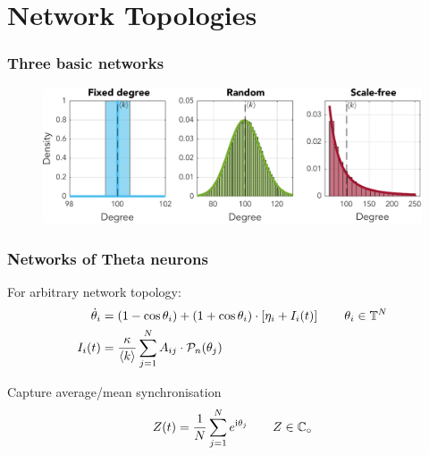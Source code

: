 


\section{\theory Network Topologies}
\begin{frame}
\frametitle{Three basic networks}
\begin{figure}[H]
\centering
\includegraphics[width = \textwidth]{../Figures/Distributions/1D.pdf}
\label{fig:1Dpdfs}
\end{figure}
\end{frame}

\begin{frame}
\frametitle{Networks of Theta neurons}
\tabitem For arbitrary network topology:
\begin{align*}
\dot{\theta}_{i} &=\left(1-\cos \theta_{i}\right)+\left(1+\cos \theta_{i}\right) \cdot \left[\eta_{i} + I_{i}(t)\right] \qquad \theta_i \in {\mathbb{T}}^N \\
I_{i}(t) &=\frac{\kappa}{{\langle k\rangle}} \sum_{j=1}^{N} A_{i j} \cdot \mathcal{P}_{n}(\theta_{j}) 
\end{align*}

\tabitem Capture average/mean synchronisation
\begin{align*}
Z(t) = \frac{1}{N} \sum_{j=1}^N e^{{\rm{i}}\theta_j}  \qquad Z \in \mathbb{C}_\circ 
\end{align*}
\end{frame}



